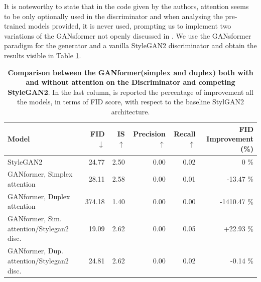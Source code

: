 \documentclass{article}
\begin{document}
    It is noteworthy to state that in the code given by the authors, attention seems to be only optionally 
    used in the discriminator and when analysing the pre-trained models provided, it is never used,
	prompting us to implement two variations of the GANsformer not openly 
    discussed in \cite{hudson2021generative}.
    We use the GANsformer paradigm for the generator and a vanilla StyleGAN2 discriminator and 
    obtain the results visible in Table \ref{tab:our-results2}.
    \begin{table}[htb]
    	\centering
        \caption{\textbf{Comparison between the GANformer(simplex and duplex) both with and without 
        attention on the Discriminator and competing StyleGAN2}.  In the last column, is reported the 
        percentage of improvement all the models, in terms of FID score, with respect to the baseline 
        StylGAN2 architecture.}
        \label{tab:our-results2}
        \vspace{3mm}
        \small
        \begin{tabular}{l|rrrrr}
	        \toprule
	        Model                        & FID $\downarrow$  & IS $\uparrow$& Precision $\uparrow$& Recall 
	        $\uparrow$& FID Improvement (\%)\\ 
	        \midrule
	        StyleGAN2                    &  24.77 & 2.50 & 0.00 & 0.02 & 0 \%\\ 
			GANformer, Simplex attention & 28.11 & 2.58 & 0.00 & 0.01 & -13.47 \%\\ 
			GANformer, Duplex attention  & 374.18 & 1.40 & 0.00 & 0.00 & -1410.47  \%\\ 
	        GANformer, Sim. attention/Stylegan2 disc. & 19.09 &  2.62  &  0.00    & 0.05  & 
	        +22.93 \% \\ 
	        GANformer, Dup. attention/Stylegan2 disc.  &  24.81  & 2.62 &   0.00   & 0.02 & 
	        -0.14 \%\\ 
	        \bottomrule
        \end{tabular}
        \end{table}
       
\end{document}
